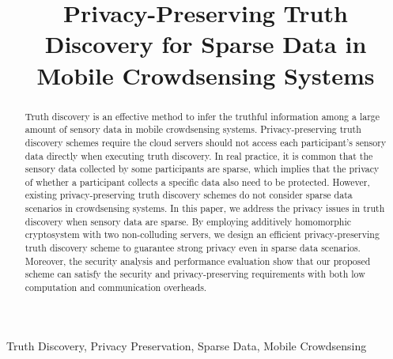 \documentclass[conference]{IEEEtran}
\begin{document}
\title{Privacy-Preserving Truth Discovery for Sparse Data in Mobile Crowdsensing Systems\\
}

\author{
}
\maketitle

\begin{abstract}
Truth discovery is an effective method to infer the truthful information among a large amount of sensory data in mobile crowdsensing systems.
Privacy-preserving truth discovery schemes require the cloud servers should not access each participant's sensory data directly when executing truth discovery.
In real practice, it is common that the sensory data collected by some participants are sparse, which implies that the privacy of whether a participant collects a specific data also need to be protected.
However, existing privacy-preserving truth discovery schemes do not consider sparse data scenarios in crowdsensing systems.
In this paper, we address the privacy issues in truth discovery when sensory data are sparse.
By employing additively homomorphic cryptosystem with two non-colluding servers, we design an efficient privacy-preserving truth discovery scheme to guarantee strong privacy even in sparse data scenarios.
Moreover, the security analysis and performance evaluation show that our proposed scheme can satisfy the security and privacy-preserving requirements with both low computation and communication overheads.
\end{abstract}

\begin{IEEEkeywords}
Truth Discovery, Privacy Preservation, Sparse Data, Mobile Crowdsensing
\end{IEEEkeywords}
\end{document}
